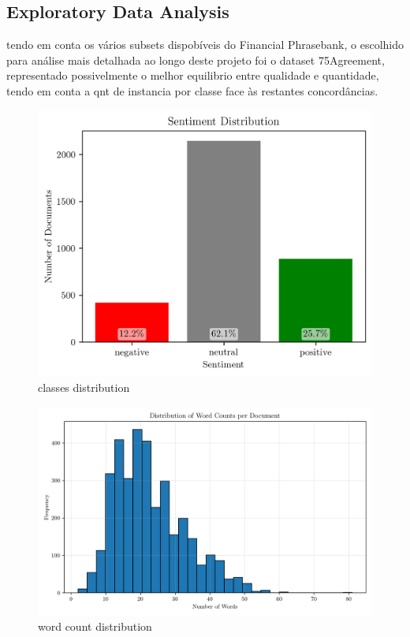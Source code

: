 \documentclass[conference]{IEEEtran}
\begin{document}


\subsection{Exploratory Data Analysis}

tendo em conta os vários subsets dispobíveis do Financial Phrasebank, o escolhido para análise mais detalhada ao longo deste projeto foi o dataset 75Agreement, representado possivelmente o melhor equilibrio entre qualidade e quantidade, tendo em conta a qnt de instancia por classe face às restantes concordâncias.

\begin{figure}[H]
    \centering
    \includegraphics[width=1\linewidth]{assets/sentiment_distribution.png}
    \caption{classes distribution}
    \label{fig:sentiment_distribution}
\end{figure}

\begin{figure}[H]
    \centering
    \includegraphics[width=1\linewidth]{assets/word_count_distribution.png}
    \caption{word count distribution}
    \label{fig:word_count_distribution}
\end{figure}
\end{document}
